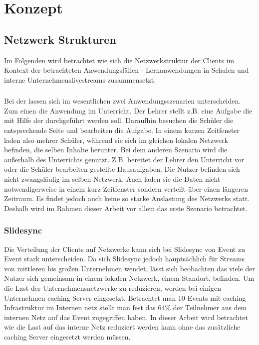 \chapter{Konzept}\label{ch:concept}
%

\section{Netzwerk Strukturen}
Im Folgenden wird betrachtet wie sich die Netzwerkstruktur der Clients im Kontext der betrachteten Anwendungsfällen - Lernanwendungen in Schulen und interne Unternehmenslivestreams zusammensetzt.
\subsection{\schulCloud}
Bei der \schulCloud lassen sich im wesentlichen zwei Anwendungsszenarien unterscheiden. Zum einen die Anwendung im Unterricht. Der Lehrer stellt z.B. eine Aufgabe die mit Hilfe der \schulCloud durchgeführt werden soll. Daraufhin besuchen die Schüler die entsprechende Seite und bearbeiten die Aufgabe. In einem kurzen Zeitfenster laden also mehrer Schüler, während sie sich im gleichen lokalen Netzwerk befinden, die selben Inhalte herunter. Bei dem anderen Szenario wird die \schulCloud außerhalb des Unterrichts genutzt. Z.B. bereitet der Lehrer den Unterricht vor oder die Schüler bearbeiten gestellte Hausaufgaben. Die Nutzer befinden sich nicht zwangsläufig im selben Netzwerk. Auch laden sie die Daten nicht notwendigerweise in einem kurz Zeitfenster sondern verteilt über einen längeren Zeitraum. Es findet jedoch auch keine so starke Auslastung des Netzwerks statt. Deshalb wird im Rahmen dieser Arbeit vor allem das erste Szenario betrachtet.

\subsection{Slidesync}
Die Verteilung der Clients auf Netzwerke kann sich bei Slidesync von Event zu Event stark unterscheiden. Da sich Slidesync jedoch hauptsächlich für Streams von mittleren bis großen Unternehmen wendet, lässt sich beobachten das viele der Nutzer sich gemeinsam in einem lokalen Netzwerk, einem Standort, befinden. Um die Last der Unternehmensnetzwerke zu reduzieren, werden bei einigen Unternehmen caching Server eingesetzt. Betrachtet man 10 Events mit caching Infrastruktur im Internen netz stellt man fest das 64\% der Teilnehmer aus dem internen Netz auf das Event zugegriffen haben. In dieser Arbeit wird betrachtet wie die Last auf das interne Netz reduziert werden kann ohne das zusätzliche caching Server eingesetzt werden müssen.

